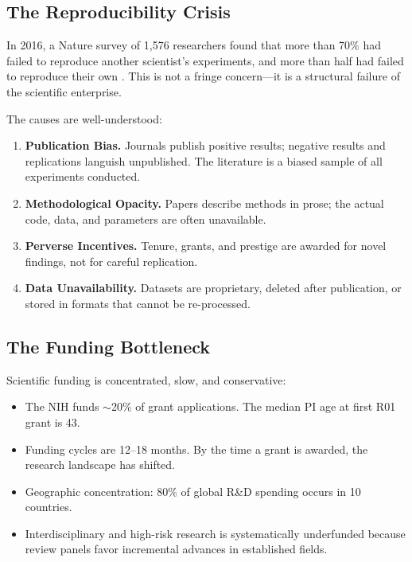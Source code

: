 \documentclass[11pt,letterpaper]{article}
\theoremstyle{definition}
\theoremstyle{remark}
\begin{document}
\subsection{The Reproducibility Crisis}

In 2016, a Nature survey of 1,576 researchers found that more than 70\% had failed to reproduce another scientist's experiments, and more than half had failed to reproduce their own \cite{baker2016reproducibility}. This is not a fringe concern---it is a structural failure of the scientific enterprise.

The causes are well-understood:

\begin{enumerate}
    \item \textbf{Publication Bias.} Journals publish positive results; negative results and replications languish unpublished. The literature is a biased sample of all experiments conducted.
    \item \textbf{Methodological Opacity.} Papers describe methods in prose; the actual code, data, and parameters are often unavailable.
    \item \textbf{Perverse Incentives.} Tenure, grants, and prestige are awarded for novel findings, not for careful replication.
    \item \textbf{Data Unavailability.} Datasets are proprietary, deleted after publication, or stored in formats that cannot be re-processed.
\end{enumerate}

\subsection{The Funding Bottleneck}

Scientific funding is concentrated, slow, and conservative:

\begin{itemize}
    \item The NIH funds $\sim$20\% of grant applications. The median PI age at first R01 grant is 43.
    \item Funding cycles are 12--18 months. By the time a grant is awarded, the research landscape has shifted.
    \item Geographic concentration: 80\% of global R\&D spending occurs in 10 countries.
    \item Interdisciplinary and high-risk research is systematically underfunded because review panels favor incremental advances in established fields.
\end{itemize}
\end{document}
